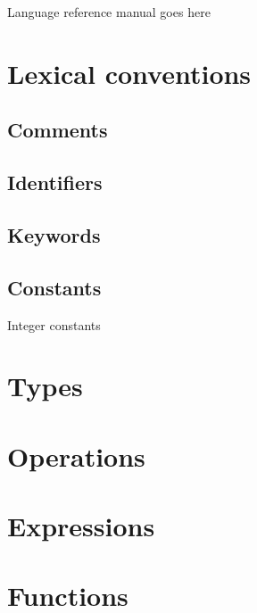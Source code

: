 Language reference manual goes here

\section{Lexical conventions}

\subsection{Comments}

\subsection{Identifiers}

\subsection{Keywords}

\subsection{Constants}
Integer constants

\section{Types}

\section{Operations}

\section{Expressions}

\section{Functions}